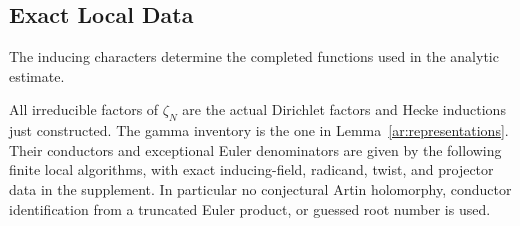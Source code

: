 \subsection{Exact Local Data}
The inducing characters determine the completed functions used in the
analytic estimate.
\begin{proposition}\label{ar:hecke-data}
All irreducible factors of $\zeta_N$ are the actual Dirichlet factors
and Hecke inductions just constructed. The gamma inventory is the one
in Lemma~\ref{ar:representations}. Their conductors and exceptional
Euler denominators are given by the following finite local algorithms,
with exact inducing-field, radicand, twist, and projector data in the
supplement. In particular no conjectural Artin holomorphy, conductor
identification from a truncated Euler product, or guessed root number
is used.
\end{proposition}
